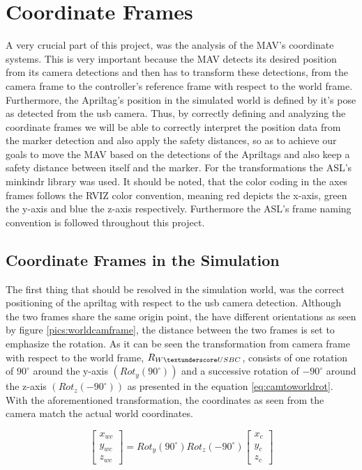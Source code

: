 \section{Coordinate Frames}
\label{sec:CoordianteFrames}

A very crucial part of this project, was the analysis of the MAV's coordinate systems. This is very important because the MAV detects its desired position from  its camera detections and then has to transform these detections, from the camera frame to the controller's reference frame with respect to the world frame. Furthermore, the Apriltag's position in the simulated world is defined by it's pose as detected from the usb camera. Thus, by correctly defining and analyzing the coordinate frames we will be able to correctly interpret the position data from the marker detection and also apply the safety distances, so as to achieve our goals to move the MAV based on the detections of the Apriltags and also keep a safety distance between itself and the marker. For the transformations the ASL's minkindr library was used. It should be noted, that the color coding in the axes frames follows the RVIZ color convention, meaning red depicts the x-axis, green the y-axis and blue the z-axis respectively. Furthermore the ASL's frame naming convention \cite{FrameNamingConvention} is followed throughout this project. 

\subsection{Coordinate Frames in the Simulation }
\label{sec: CoordinatesinSimulation}
 
The first thing that should be resolved in the simulation world, was the correct positioning of the apriltag with respect to the usb camera detection. Although the two frames share the same origin point, the have different orientations as seen by figure \ref{pics:worldcamframe}, the distance between the two frames is set to emphasize the rotation. As it can be seen the transformation from camera frame with respect to the world frame, $R_{W\textunderscore USBC}$, consists of one rotation of $90^{\circ}$ around the y-axis $(Rot_{y}(90^{\circ}))$ and a successive rotation of $-90^{\circ}$ around the z-axis $(Rot_z(-90^{\circ}))$ as presented in the equation \ref{eq:camtoworldrot}. With the aforementioned transformation, the coordinates as seen from the camera match the actual world coordinates. 
 
\begin{equation}
\label{eq:camtoworldrot}
\left[\begin{array}{c}
x_{wc} \\ y_{wc} \\ z_{wc}  \end{array} \right] = Rot_{y}(90^{\circ})Rot_z(-90^{\circ})\left[ \begin{array}{c} x_c \\ y_c \\z_c \end{array} \right]
\end{equation}
 
